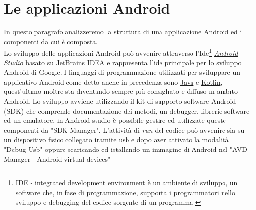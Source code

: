 \section{Le applicazioni Android}
\label{sub:aplicationAndroid}
In questo paragrafo analizzeremo la struttura di una applicazione Android ed i componenti da cui è composta.
\\Lo sviluppo delle applicazioni Android può avvenire attraverso l'Ide\footnote{IDE - integrated development environment è un ambiente di sviluppo, un software che, in fase di programmazione, supporta i programmatori nello sviluppo e debugging del codice sorgente di un programma \cite{itwiki:118335792} } \href{https://developer.android.com/studio/index.html}{\textit{Android Studio}} basato su JetBrains IDEA e rappresenta l'ide principale per lo sviluppo Android di Google. I linguaggi di programmazione utilizzati per sviluppare un applicativo Android come detto anche in precedenza sono \href{https://www.java.com/it/}{Java} e \href{https://kotlinlang.org/}{Kotlin}, quest'ultimo inoltre sta diventando sempre più consigliato e diffuso in ambito Android. Lo sviluppo avviene utilizzando il kit di supporto software Android (SDK) che comprende documentazione dei metodi, un debugger, librerie software ed un emulatore, in Android studio è possibile gestire ed utilizzate queste componenti da "SDK Manager". L'attività di \textit{run} del codice può avvenire sia su un dispositivo fisico collegato tramite usb e dopo aver attivato la modalità "Debug Usb" oppure scaricando ed istallando un immagine di Android nel "AVD Manager - Android virtual devices" 

